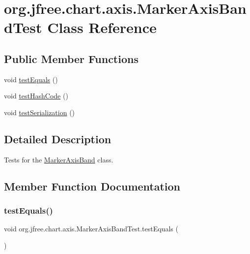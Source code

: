 \hypertarget{classorg_1_1jfree_1_1chart_1_1axis_1_1_marker_axis_band_test}{}\section{org.\+jfree.\+chart.\+axis.\+Marker\+Axis\+Band\+Test Class Reference}
\label{classorg_1_1jfree_1_1chart_1_1axis_1_1_marker_axis_band_test}
\subsection*{Public Member Functions}
\begin{DoxyCompactItemize}
\item 
void \mbox{\hyperlink{classorg_1_1jfree_1_1chart_1_1axis_1_1_marker_axis_band_test_a6b97d519747a02f4c0c4b810dd1e8c06}{test\+Equals}} ()
\item 
void \mbox{\hyperlink{classorg_1_1jfree_1_1chart_1_1axis_1_1_marker_axis_band_test_a3a7035f7a3f4e36659e40556509ee21e}{test\+Hash\+Code}} ()
\item 
void \mbox{\hyperlink{classorg_1_1jfree_1_1chart_1_1axis_1_1_marker_axis_band_test_a42292fb52946ec5812f81ce3c4140fa0}{test\+Serialization}} ()
\end{DoxyCompactItemize}


\subsection{Detailed Description}
Tests for the \mbox{\hyperlink{classorg_1_1jfree_1_1chart_1_1axis_1_1_marker_axis_band}{Marker\+Axis\+Band}} class. 

\subsection{Member Function Documentation}
\mbox{\label{classorg_1_1jfree_1_1chart_1_1axis_1_1_marker_axis_band_test_a6b97d519747a02f4c0c4b810dd1e8c06}} 
\subsubsection{\texorpdfstring{test\+Equals()}{testEquals()}}
{\footnotesize\ttfamily void org.\+jfree.\+chart.\+axis.\+Marker\+Axis\+Band\+Test.\+test\+Equals (\begin{DoxyParamCaption}{ }\end{DoxyParamCaption})}

